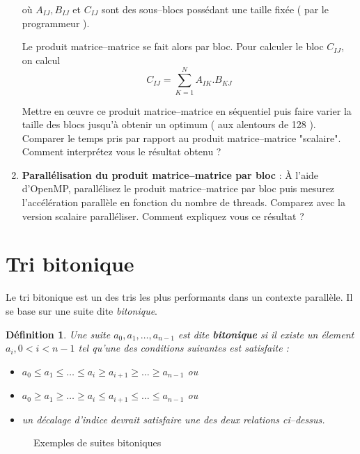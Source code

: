 \documentclass[11pt,a4paper]{article}
\newtheorem{definition}{Définition}
\begin{document}
\begin{enumerate}
où $A_{IJ},B_{IJ}$ et $C_{IJ}$ sont des sous--blocs possédant une taille fixée ( par le programmeur ).

Le produit matrice--matrice se fait alors par bloc. Pour calculer le bloc $C_{IJ}$, on calcul
\[
C_{IJ} = \sum_{K=1}^{N}A_{IK}.B_{KJ}
\]

Mettre en {\oe}uvre ce produit matrice--matrice en séquentiel puis faire varier la taille des blocs jusqu'à obtenir un optimum ( aux alentours de 128 ).
Comparer le temps pris par rapport au produit matrice--matrice "scalaire".
Comment interprétez vous le résultat obtenu ?

\item \textbf{\color{blue}Parallélisation du produit matrice--matrice par bloc }: \`A l'aide d'OpenMP, parallélisez le produit matrice--matrice
par bloc puis mesurez l'accélération parallèle en fonction du nombre de threads. Comparez avec la version scalaire paralléliser. Comment expliquez vous ce résultat ?
\end{enumerate}

\section{Tri bitonique}

Le tri bitonique est un des tris les plus performants dans un contexte
parallèle. Il se base sur une suite dite \textsl{bitonique}.

\begin{definition}
Une suite $a_{0},a_{1},\ldots,a_{n-1}$
est dite \textbf{bitonique} si il existe un élement $a_{i},0<i<n-1$ tel qu'une
des conditions suivantes est satisfaite :
\begin{itemize}
\item $a_{0}\leq a_{1}\leq \ldots \leq a_{i} \geq a_{i+1} \geq \ldots \geq a_{n-1}$ ou
\item $a_{0}\geq a_{1}\geq \ldots \geq a_{i} \leq a_{i+1} \leq \ldots \leq a_{n-1}$ ou
\item un décalage d'indice devrait satisfaire une des deux relations ci--dessus.
\end{itemize}
\end{definition}

\begin{figure}[h]
\caption{Exemples de suites bitoniques}
\end{figure}
\end{document}
